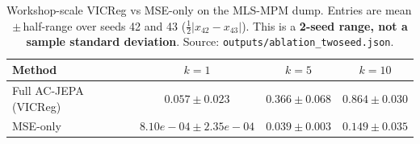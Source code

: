 \begin{table}[t]
  \centering
  \small
  \caption{Workshop-scale VICReg vs MSE-only on the MLS-MPM dump. Entries are mean\,$\pm$\,half-range over seeds 42 and 43 ($\frac{1}{2}|x_{42}-x_{43}|$). This is a \textbf{2-seed range, not a sample standard deviation}. Source: \texttt{outputs/ablation\_twoseed.json}.}
  \label{tab:twoseed}
  \begin{tabular}{lccc}
    \toprule
    Method & $k{=}1$ & $k{=}5$ & $k{=}10$ \\
    \midrule
    Full AC-JEPA (VICReg) & $0.057{\pm}0.023$ & $0.366{\pm}0.068$ & $0.864{\pm}0.030$ \\
    MSE-only & $8.10e-04{\pm}2.35e-04$ & $0.039{\pm}0.003$ & $0.149{\pm}0.035$ \\
    \bottomrule
  \end{tabular}
\end{table}
